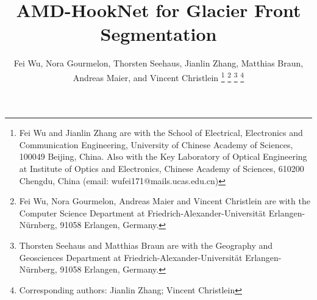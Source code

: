 \documentclass[lettersize,journal,siunitx]{IEEEtran}
\begin{document}
\makeatletter
\let\old@ps@headings\ps@headings
\let\old@ps@IEEEtitlepagestyle\ps@IEEEtitlepagestyle
\def\confheader#1{\def\ps@IEEEtitlepagestyle{\old@ps@IEEEtitlepagestyle \def\@oddhead{\strut\hfill#1\hfill\strut}\def\@evenhead{\strut\hfill#1\hfill\strut}}\ps@headings }
\makeatother

\confheader{
	\parbox{20cm}{SUBMITTED TO IEEE TRANSACTIONS ON GEOSCIENCE AND REMOTE SENSING FOR POSSIBLE PUBLICATION.}
}

\title{AMD-HookNet for Glacier Front Segmentation}

\author{Fei Wu, Nora Gourmelon, Thorsten Seehaus, Jianlin Zhang, Matthias Braun, Andreas Maier, and Vincent Christlein
\thanks{Fei Wu and Jianlin Zhang are with the School of Electrical, Electronics and Communication Engineering, University of Chinese Academy of Sciences, 100049 Beijing, China. Also with the Key Laboratory of Optical Engineering at Institute of Optics and Electronics, Chinese Academy of Sciences, 610200 Chengdu, China (email: wufei171@mails.ucas.edu.cn)}
\thanks{Fei Wu, Nora Gourmelon, Andreas Maier and Vincent Christlein are with the Computer Science Department at Friedrich-Alexander-Universität Erlangen-Nürnberg, 91058 Erlangen, Germany.}
\thanks{Thorsten Seehaus and Matthias Braun are with the Geography and Geosciences Department at Friedrich-Alexander-Universität Erlangen-Nürnberg, 91058 Erlangen, Germany.}
\thanks{Corresponding authors: Jianlin Zhang; Vincent Christlein}
}

\maketitle
\end{document}
